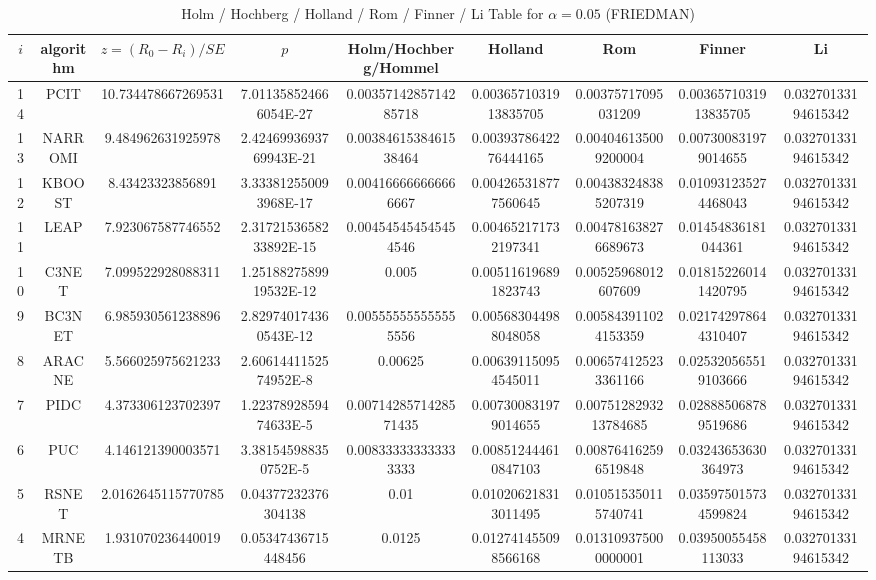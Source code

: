 \documentclass[a4paper,10pt]{article}
\begin{document}
\begin{landscape}
\begin{table}[!htp]
\begin{tabular}{
|r|r|r|r|r|r|r|r|r|r|r|r|r|r|r|r|}
\end{tabular}
\end{table}

\newpage

\begin{table}[!htp]
\centering\scriptsize
\caption{Holm / Hochberg / Holland / Rom / Finner / Li Table for $\alpha=0.05$ (FRIEDMAN)}
\begin{tabular}{ccccccccc}
$i$&algorithm&$z=(R_0 - R_i)/SE$&$p$&Holm/Hochberg/Hommel&Holland&Rom&Finner&Li\\
\hline
14&PCIT&10.734478667269531&7.011358524666054E-27&0.0035714285714285718&0.0036571031913835705&0.00375717095031209&0.0036571031913835705&0.03270133194615342\\
13&NARROMI&9.484962631925978&2.4246993693769943E-21&0.0038461538461538464&0.0039378642276444165&0.004046135009200004&0.007300831979014655&0.03270133194615342\\
12&KBOOST&8.43423323856891&3.333812550093968E-17&0.004166666666666667&0.004265318777560645&0.004383248385207319&0.010931235274468043&0.03270133194615342\\
11&LEAP&7.923067587746552&2.3172153658233892E-15&0.004545454545454546&0.004652171732197341&0.004781638276689673&0.01454836181044361&0.03270133194615342\\
10&C3NET&7.099522928088311&1.2518827589919532E-12&0.005&0.005116196891823743&0.00525968012607609&0.018152260141420795&0.03270133194615342\\
9&BC3NET&6.985930561238896&2.829740174360543E-12&0.005555555555555556&0.005683044988048058&0.005843911024153359&0.021742978644310407&0.03270133194615342\\
8&ARACNE&5.566025975621233&2.6061441152574952E-8&0.00625&0.006391150954545011&0.006574125233361166&0.025320565519103666&0.03270133194615342\\
7&PIDC&4.373306123702397&1.2237892859474633E-5&0.0071428571428571435&0.007300831979014655&0.0075128293213784685&0.028885068789519686&0.03270133194615342\\
6&PUC&4.146121390003571&3.381545988350752E-5&0.008333333333333333&0.008512444610847103&0.008764162596519848&0.03243653630364973&0.03270133194615342\\
5&RSNET&2.0162645115770785&0.04377232376304138&0.01&0.010206218313011495&0.010515350115740741&0.035975015734599824&0.03270133194615342\\
4&MRNETB&1.931070236440019&0.05347436715448456&0.0125&0.012741455098566168&0.013109375000000001&0.03950055458113033&0.03270133194615342\\

\end{tabular}
\end{table}
\end{landscape}
\end{document}

